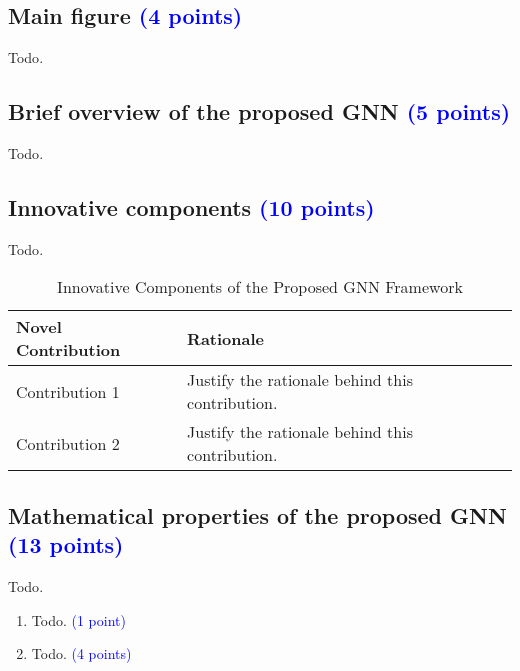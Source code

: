 \documentclass[conference]{IEEEtran}
\begin{document}
\subsection{Main figure \textcolor{blue}{(4 points)}}

\textcolor{ashgrey}{Todo}.

\subsection{Brief overview of the proposed GNN \textcolor{blue}{(5 points)}}

\textcolor{ashgrey}{Todo}.

\subsection{Innovative components \textcolor{blue}{(10 points)}}

\textcolor{ashgrey}{Todo}.

\begin{table}[ht!]
\renewcommand{\arraystretch}{1.3}
\centering
\caption{Innovative Components of the Proposed GNN Framework}
\begin{tabular}{|p{3cm}|p{5cm}|}
\hline
\textbf{Novel Contribution} & \textbf{Rationale} \\
\hline
Contribution 1 & Justify the rationale behind this contribution. \\
\hline
Contribution 2 & Justify the rationale behind this contribution. \\
\hline
\end{tabular}
\label{tab:contributions}
\end{table}



\subsection{Mathematical properties of the proposed GNN \textcolor{blue}{(13 points)}}

\textcolor{ashgrey}{Todo}.

\begin{tcolorbox}[colframe=pink, colback=pink!20, title=Permutation invariance \textcolor{blue}{(5 points)}, height=4cm]
\begin{enumerate}[label=\alph*)]
\item \textcolor{ashgrey}{Todo}. \textcolor{blue}{(1 point)}
\item \textcolor{ashgrey}{Todo}. \textcolor{blue}{(4 points)}
\end{enumerate} 
 
\end{tcolorbox}
\end{document}
